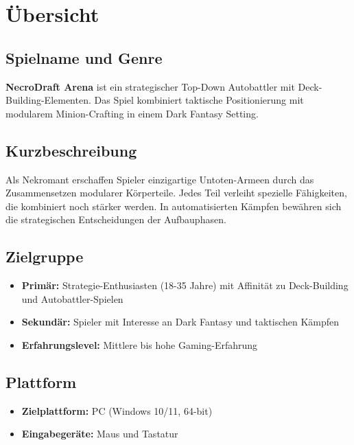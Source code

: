 \chapter{Übersicht}\label{chap:uebersicht}

\section{Spielname und Genre}

\textbf{NecroDraft Arena} ist ein strategischer Top-Down Autobattler mit Deck-Building-Elementen. 
Das Spiel kombiniert taktische Positionierung mit modularem Minion-Crafting in einem Dark Fantasy Setting.

\section{Kurzbeschreibung}

Als Nekromant erschaffen Spieler einzigartige Untoten-Armeen durch das Zusammensetzen modularer Körperteile. 
Jedes Teil verleiht spezielle Fähigkeiten, die kombiniert noch stärker werden.
In automatisierten Kämpfen bewähren sich die strategischen Entscheidungen der Aufbauphasen.

\section{Zielgruppe}

\begin{itemize}
    \item 	\textbf{Primär:} Strategie-Enthusiasten (18-35 Jahre) mit Affinität zu Deck-Building und Autobattler-Spielen
    \item 	\textbf{Sekundär:} Spieler mit Interesse an Dark Fantasy und taktischen Kämpfen
    \item 	\textbf{Erfahrungslevel:} Mittlere bis hohe Gaming-Erfahrung
\end{itemize}

\section{Plattform}

\begin{itemize}
    \item 	\textbf{Zielplattform:} PC (Windows 10/11, 64-bit)
    \item 	\textbf{Eingabegeräte:} Maus und Tastatur
\end{itemize}

